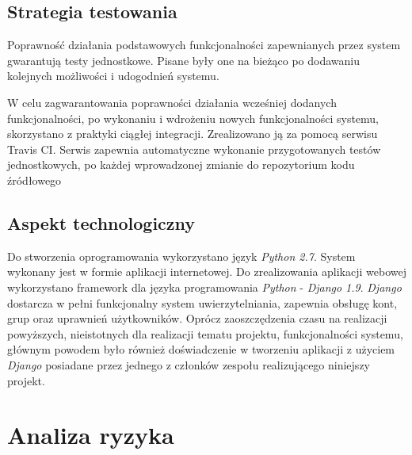\documentclass[pdflatex,11pt]{../aghdoc_version2}
\newlength\tindent
\renewcommand{\indent}{\hspace*{\tindent}}
\begin{document}
\newpage
\section{Strategia testowania}
Poprawność działania podstawowych funkcjonalności zapewnianych przez system
gwarantują testy jednostkowe. Pisane były one na bieżąco po dodawaniu kolejnych
możliwości i udogodnień systemu.

\indent W celu zagwarantowania poprawności działania wcześniej dodanych funkcjonalności, po
wykonaniu i wdrożeniu nowych funkcjonalności systemu, skorzystano z praktyki ciągłej
integracji. Zrealizowano ją za pomocą serwisu Travis CI. Serwis zapewnia automatyczne
wykonanie przygotowanych testów jednostkowych, po każdej wprowadzonej zmianie do
repozytorium kodu źródłowego
\section{Aspekt technologiczny}
\label{sec:apekt_technologiczny}
Do stworzenia oprogramowania wykorzystano język \textit{Python 2.7}. System wykonany jest w
formie aplikacji internetowej. Do zrealizowania aplikacji webowej wykorzystano framework
dla języka programowania \textit{Python} - \textit{Django 1.9}. \textit{Django} dostarcza w pełni funkcjonalny
system uwierzytelniania, zapewnia obsługę kont, grup oraz uprawnień użytkowników.
Oprócz zaoszczędzenia czasu na realizacji powyższych, nieistotnych dla realizacji tematu
projektu, funkcjonalności systemu, głównym powodem było również doświadczenie w
tworzeniu aplikacji z użyciem \textit{Django} posiadane przez jednego z członków zespołu
realizującego niniejszy projekt.

\chapter{Analiza ryzyka}
\end{document}
